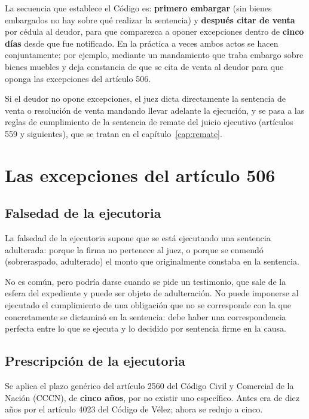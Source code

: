 \documentclass[12pt,oneside]{book}
\begin{document}
La secuencia que establece el Código es: \textbf{primero embargar} (sin bienes embargados no hay sobre qué realizar la sentencia) y \textbf{después citar de venta} por cédula al deudor, para que comparezca a oponer excepciones dentro de \textbf{cinco días} desde que fue notificado. En la práctica a veces ambos actos se hacen conjuntamente: por ejemplo, mediante un mandamiento que traba embargo sobre bienes muebles y deja constancia de que se cita de venta al deudor para que oponga las excepciones del artículo 506.

Si el deudor no opone excepciones, el juez dicta directamente la sentencia de venta o resolución de venta mandando llevar adelante la ejecución, y se pasa a las reglas de cumplimiento de la sentencia de remate del juicio ejecutivo (artículos 559 y siguientes), que se tratan en el capítulo~\ref{cap:remate}.

\section{Las excepciones del artículo 506}

\subsection{Falsedad de la ejecutoria}

La falsedad de la ejecutoria supone que se está ejecutando una sentencia adulterada: porque la firma no pertenece al juez, o porque se enmendó (sobreraspado, adulterado) el monto que originalmente constaba en la sentencia.

No es común, pero podría darse cuando se pide un testimonio, que sale de la esfera del expediente y puede ser objeto de adulteración. No puede imponerse al ejecutado el cumplimiento de una obligación que no se corresponde con la que concretamente se dictaminó en la sentencia: debe haber una correspondencia perfecta entre lo que se ejecuta y lo decidido por sentencia firme en la causa.

\subsection{Prescripción de la ejecutoria}

Se aplica el plazo genérico del artículo 2560 del Código Civil y Comercial de la Nación (CCCN), de \textbf{cinco años}, por no existir uno específico. Antes era de diez años por el artículo 4023 del Código de Vélez; ahora se redujo a cinco.
\end{document}
